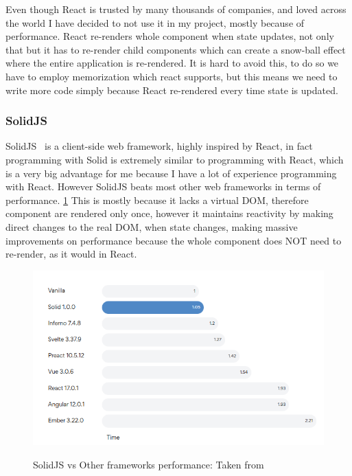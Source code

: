 \documentclass[titlepage]{article}
\begin{document}
Even though React is trusted by many thousands of companies, and loved across the world I have decided to not use it in my project, mostly because of performance. React re-renders whole component when state updates, not only that but it has to re-render child components which can create a snow-ball effect where the entire application is re-rendered. It is hard to avoid this, to do so we have to employ memorization which react supports, but this means we need to write more code simply because React re-rendered every time state is updated. \\

\subsubsection{SolidJS}
SolidJS~\cite{solid} is a client-side web framework, highly inspired by React, in fact programming with Solid is extremely similar to programming with React, which is a very big advantage for me because I have a lot of experience programming with React. However SolidJS beats most other web frameworks in terms of performance. \ref{solidvsworld} This is mostly because it lacks a virtual DOM, therefore component are rendered only once, however it maintains reactivity by making direct changes to the real DOM, when state changes, making massive improvements on performance because the whole component does NOT need to re-render, as it would in React. \\


\begin{figure}
\includegraphics[width=1\textwidth]{solidjs_perf.png}
  \label{solidvsworld}
  \caption{SolidJS vs Other frameworks performance: Taken from~\cite{solid}}
\centering
\end{figure}
\end{document}
